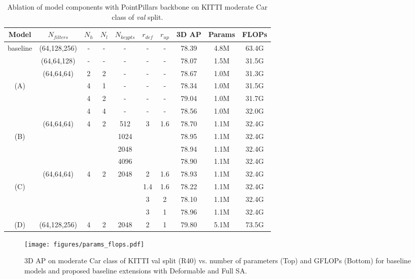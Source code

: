 \documentclass[10pt,twocolumn,letterpaper]{article}
\begin{document}
\setlength{\tabcolsep}{1.0pt}
\begin{table}[t]
\footnotesize
    \centering
    \begin{tabular*}{\linewidth}{c||cccccc|ccc}
        \hline
        Model & $N_{filters}$ & $N_h$ & $N_l$  & $N_{keypts}$ & $r_{def}$ & $r_{up}$ & 3D AP & Params & FLOPs\\
        \hline
        baseline & (64,128,256) & - & - &  - & - & - & 78.39 & 4.8M & 63.4G \\
         & (64,64,128) & - & - &  - & - & - & 78.07 & 1.5M  & 31.5G \\
        \hline 
        & (64,64,64) & 2 & 2 &  - & - & - & 78.67 & 1.0M & 31.3G \\
        (A) &  & 4 & 1 &  - & - & - & 78.34 & 1.0M & 31.5G \\
        &  & 4 & 2 &  - & - & - & 79.04 & 1.0M & 31.7G \\
        &  & 4 & 4 &  - & - & - & 78.56 & 1.0M & 32.0G \\
        \hline
        & (64,64,64) & 4 & 2 &  512 & 3 & 1.6 & 78.70 & 1.1M & 32.4G \\
        (B) & & &  &  1024 &  &  & 78.95 & 1.1M & 32.4G \\
         &  &  &  &   2048 &  &  & 78.94 & 1.1M & 32.4G \\
        &  & &  &   4096 &  &  & 78.90 & 1.1M & 32.4G \\
        \hline
        &  (64,64,64) & 4 & 2 & 2048 & 2 & 1.6 & 78.93 & 1.1M & 32.4G \\
        (C) & & &  &    & 1.4 & 1.6 & 78.22 & 1.1M & 32.4G \\
        &  &  &  &  & 3 & 2 & 78.10 & 1.1M & 32.4G \\
        &  &  &  &  & 3 & 1 & 78.96 & 1.1M & 32.4G \\
        \hline
        (D) & (64,128,256) & 4 & 2 &  2048 & 2 & 1 & 79.80 & 5.1M & 73.5G \\
        \hline
    \end{tabular*}
    \caption{Ablation of model components with PointPillars backbone on KITTI moderate Car class of \textit{val} split.}
    \label{tab:ablation_components}
\end{table} 
\begin{figure}[t]
    \centering
    \texttt{[image: figures/params\_flops.pdf]}
    \caption{3D AP on moderate Car class of KITTI val split (R40) vs. number of parameters (Top) and GFLOPs (Bottom) for baseline models and proposed baseline extensions with Deformable and Full SA.}
    \label{teaser_graph}
    \vspace{-0.5cm}
\end{figure}
\end{document}
